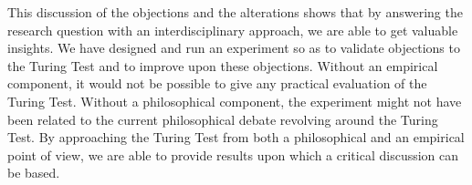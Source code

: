This discussion of the objections and the alterations shows that by answering the research question with an interdisciplinary approach, we are able to get valuable insights. We have designed and run an experiment so as to validate objections to the Turing Test and to improve upon these objections. Without an empirical component, it would not be possible to give any practical evaluation of the Turing Test. Without a philosophical component, the experiment might not have been related to the current philosophical debate revolving around the Turing Test. By approaching the Turing Test from both a philosophical and an empirical point of view, we are able to provide results upon which a critical discussion can be based.
